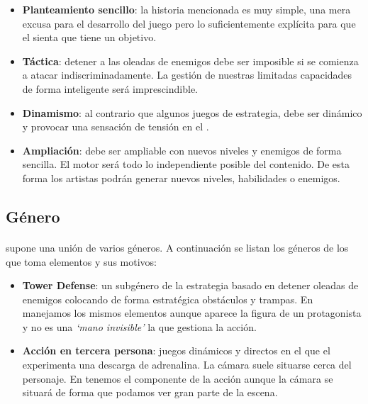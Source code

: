 \begin{itemize}
    \item \textbf{Planteamiento sencillo}: la historia mencionada es muy
    simple, una mera excusa para el desarrollo del juego pero lo suficientemente
    explícita para que el \jugador sienta que tiene un objetivo.
    \item \textbf{Táctica}: detener a las oleadas de enemigos debe ser
    imposible si se comienza a atacar indiscriminadamente. La gestión de
    nuestras limitadas capacidades de forma inteligente será imprescindible.
    \item \textbf{Dinamismo}: al contrario que algunos juegos de estrategia,
    \juego debe ser dinámico y provocar una sensación de tensión en el
    \jugador.
    \item \textbf{Ampliación}: \juego debe ser ampliable con nuevos niveles
    y enemigos de forma sencilla. El motor será todo lo independiente posible
    del contenido. De esta forma los artistas podrán generar nuevos niveles,
    habilidades o enemigos.
\end{itemize}

\subsection{Género}
\label{sec:int-genero}

\paragraph{}
\juego supone una unión de varios géneros. A continuación se listan los géneros
de los que toma elementos y sus motivos:

\begin{itemize}
	\item \textbf{Tower Defense}: un subgénero de la estrategia basado
	en detener oleadas de enemigos colocando de forma estratégica obstáculos y trampas.
        En \juego manejamos los mismos elementos aunque aparece la figura
	de un protagonista y no es una \emph{`mano invisible'} la que gestiona la acción.
	
	\item \textbf{Acción en tercera persona}: juegos dinámicos y directos
	en el que el \jugador experimenta una descarga de adrenalina.
	La cámara suele situarse cerca del personaje. En \juego tenemos el
	componente de la acción aunque la cámara se situará de forma que podamos
	ver gran parte de la escena.
\end{itemize}

